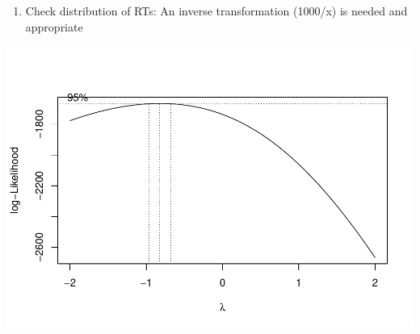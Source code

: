 \documentclass[
]{article}
\newenvironment{Shaded}{\begin{snugshade}}{\end{snugshade}}
\newcommand{\CommentTok}[1]{\textcolor[rgb]{0.56,0.35,0.01}{\textit{#1}}}
\newcommand{\DecValTok}[1]{\textcolor[rgb]{0.00,0.00,0.81}{#1}}
\newcommand{\FunctionTok}[1]{\textcolor[rgb]{0.00,0.00,0.00}{#1}}
\newcommand{\NormalTok}[1]{#1}
\newcommand{\OtherTok}[1]{\textcolor[rgb]{0.56,0.35,0.01}{#1}}
\newcommand{\SpecialCharTok}[1]{\textcolor[rgb]{0.00,0.00,0.00}{#1}}
\providecommand{\tightlist}{%
  \setlength{\itemsep}{0pt}\setlength{\parskip}{0pt}}
\begin{document}
\begin{enumerate}
\def\labelenumi{\alph{enumi})}
\setcounter{enumi}{1}
\tightlist
\item
  Check distribution of RTs: An inverse transformation (1000/x) is
  needed and appropriate
\end{enumerate}

\begin{Shaded}
\end{Shaded}

\includegraphics{01_CSI_online_aphasia_power_analysis_summary_files/figure-latex/RT distributions-1.pdf}

\begin{Shaded}
\end{Shaded}
\end{document}
